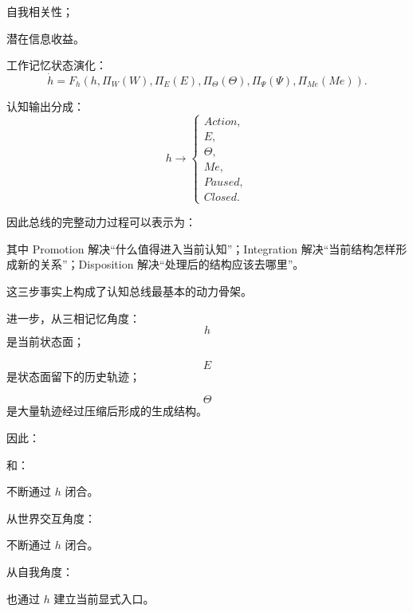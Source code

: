 自我相关性；

潜在信息收益。

工作记忆状态演化：
\[
\dot h
=
F_h
\left(
h,
\Pi_W(W),
\Pi_E(E),
\Pi_\Theta(\Theta),
\Pi_\Psi(\Psi),
\Pi_{Me}(Me)
\right).
\]

认知输出分成：
\[
h
\rightarrow
\begin{cases}
Action,\\
E,\\
\Theta,\\
Me,\\
Paused,\\
Closed.
\end{cases}
\]

因此总线的完整动力过程可以表示为：
\begin{statementbox}
\centering
{}
\end{statementbox}

其中 Promotion 解决“什么值得进入当前认知”；Integration 解决“当前结构怎样形成新的关系”；Disposition 解决“处理后的结构应该去哪里”。

这三步事实上构成了认知总线最基本的动力骨架。

进一步，从三相记忆角度：
\[
h
\]
是当前状态面；

\[
E
\]
是状态面留下的历史轨迹；

\[
\Theta
\]
是大量轨迹经过压缩后形成的生成结构。

因此：
\begin{statementbox}
\centering
{}
\end{statementbox}
和：
\begin{statementbox}
\centering
{}
\end{statementbox}
不断通过 $h$ 闭合。

从世界交互角度：
\begin{statementbox}
\centering
{}
\end{statementbox}
不断通过 $h$ 闭合。

从自我角度：
\begin{statementbox}
\centering
{}
\end{statementbox}
也通过 $h$ 建立当前显式入口。


